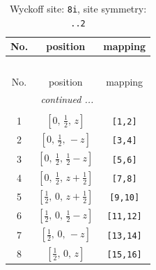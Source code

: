 \documentclass[fleqn,8pt]{jsarticle}
\begin{document}
\begin{longtable}{ccc}
\caption{Wyckoff site: {\tt 8i}, site symmetry: {\tt ..2}}
 \\
 \hline \hline
No. & position & mapping \\ \hline \endfirsthead

\multicolumn{2}{l}{\tablename\ \thetable{}} \\
 \hline \hline
No. & position & mapping \\ \hline \endhead

 \hline \hline
\multicolumn{2}{r}{\footnotesize\it continued ...} \\ \endfoot

 \hline \hline
\multicolumn{2}{r}{} \\ \endlastfoot

1 & $\left[ 0,\, \frac{1}{2},\, z \right]$ & {\tt [1,2]} \\ \hline
2 & $\left[ 0,\, \frac{1}{2},\, - z \right]$ & {\tt [3,4]} \\ \hline
3 & $\left[ 0,\, \frac{1}{2},\, \frac{1}{2} - z \right]$ & {\tt [5,6]} \\ \hline
4 & $\left[ 0,\, \frac{1}{2},\, z + \frac{1}{2} \right]$ & {\tt [7,8]} \\ \hline
5 & $\left[ \frac{1}{2},\, 0,\, z + \frac{1}{2} \right]$ & {\tt [9,10]} \\ \hline
6 & $\left[ \frac{1}{2},\, 0,\, \frac{1}{2} - z \right]$ & {\tt [11,12]} \\ \hline
7 & $\left[ \frac{1}{2},\, 0,\, - z \right]$ & {\tt [13,14]} \\ \hline
8 & $\left[ \frac{1}{2},\, 0,\, z \right]$ & {\tt [15,16]} \\
\end{longtable}
\renewcommand{\arraystretch}{1.2}
\end{document}
